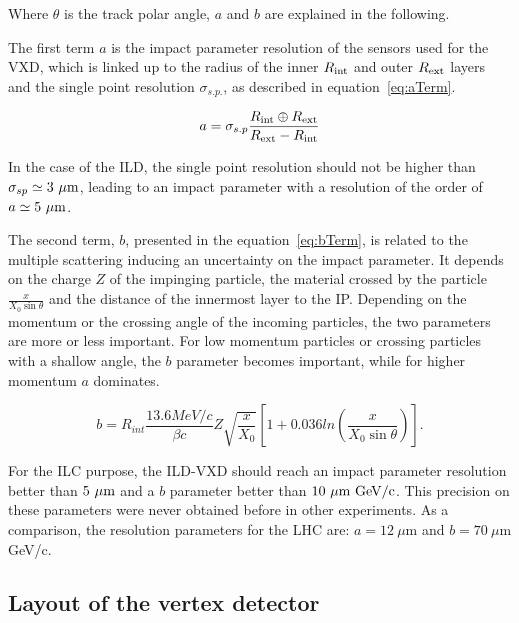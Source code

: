     Where $\theta$ is the track polar angle, $a$ and $b$ are explained in the following.

   The first term $a$ is the impact parameter resolution of the sensors used for the \gls{VXD}, which is linked up to the radius of the inner $R_{\rm{int}}$ and outer $R_{\rm{ext}}$ layers and the single point resolution $\sigma_{s.p.}$, as described in equation~\ref{eq:aTerm}.

   \begin{equation}
     a = \sigma_{s.p}\frac{R_{\rm{int}} \oplus R_{\rm{ext}}}{R_{\rm{ext}} - R_{\rm{int}}}
     \label{eq:aTerm}
   \end{equation}

    In the case of the \gls{ILD}, the single point resolution should not be higher than $\sigma_{sp} \simeq 3~\rm{\mu m}$, leading to an impact parameter with a resolution of the order of $a \simeq 5~\rm{\mu m}$.
   
    The second term, $b$, presented in the equation~\ref{eq:bTerm}, is related to the multiple scattering inducing an uncertainty on the impact parameter.
    It depends on the charge $Z$ of the impinging particle, the material crossed by the particle $\frac{x}{X_0 \sin{\theta}}$ and the distance of the innermost layer to the \gls{IP}.
    Depending on the momentum or the crossing angle of the incoming particles, the two parameters are more or less important.
    For low momentum particles or crossing particles with a shallow angle, the $b$ parameter becomes important, while for higher momentum $a$ dominates.


    \begin{equation}
      b = R_{int} \frac{13.6 MeV/c}{\beta c}  Z \sqrt{\frac{x}{X_{0}}} \left[ 1 + 0.036 ln \left( \frac{x}{X_{0}\sin{\theta}} \right) \right].
      \label{eq:bTerm}
    \end{equation}
   
   For the \gls{ILC} purpose, the \gls{ILD}-\gls{VXD} should reach an impact parameter resolution better than $5~\rm{\mu m}$ and a $b$ parameter better than $10~\rm{\mu m~GeV/c}$. 
   This precision on these parameters were never obtained before in other experiments.
   As a comparison, the resolution parameters for the \gls{LHC} are: $a =  12 \ \mu$m and $b = 70 \ \mu$m GeV/c. 

   \subsection{Layout of the vertex detector}

